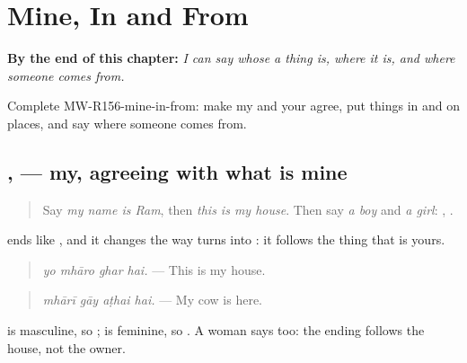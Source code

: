 
\chapter{Mine, In and From}
\label{ch:mw-a2-mine-in-and-from}

\begin{chapteropening}
\textbf{By the end of this chapter:} \emph{I can say whose a thing is, where it is, and where someone comes from.}

Complete MW-R156-mine-in-from: make my and your agree, put things in and on places, and say where someone comes from.
\end{chapteropening}

\section[\texorpdfstring{\mw{म्हारो} · \mw{म्हारी} (mhāro · mhārī)}{म्हारो · म्हारी (mhāro · mhārī)}]{,  — my, agreeing with what is mine}

\label{lesson:MW-C156-mhari}



\begin{quote}
Say \emph{my name is Ram}, then \emph{this is my house}. Then say \emph{a boy} and \emph{a girl}: \textbf{}, \textbf{}.
\end{quote}

\begin{grammarlens}[title={Grammar Lens: the thing decides}]
\textbf{} ends like \textbf{}, and it changes the way \textbf{} turns into \textbf{}: it follows the thing that is yours.

\begin{quote}
\textbf{   }
\end{quote}

\begin{quote}
\emph{yo mhāro ghar hai.} — This is my house.
\end{quote}

\begin{quote}
\textbf{   }
\end{quote}

\begin{quote}
\emph{mhārī gāy aṭhai hai.} — My cow is here.
\end{quote}

\textbf{} is masculine, so \textbf{}; \textbf{} is feminine, so \textbf{}. A woman says \textbf{ } too: the ending follows the house, not the owner.
\end{grammarlens}


